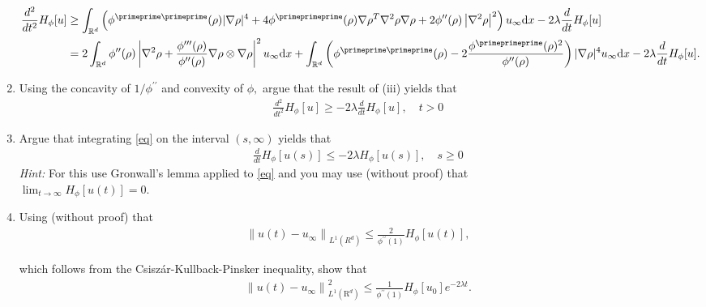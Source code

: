 \begin{exercise}
\begin{enumerate}[label = (\roman*)]
\begin{align*}
    \frac{d^{2}}{d t^{2}} H_{\phi}[u] &\geq
    \int_{\mathbb{R}^{d}}\left(\phi^{\primeprime \primeprime}(\rho)|\nabla \rho|^{4}+4
    \phi^{\primeprimeprime}(\rho) \nabla \rho^{T} \nabla^{2} \rho \nabla \rho+2
    \phi^{\prime \prime}(\rho)\left|\nabla^{2} \rho\right|^{2}\right) u_{\infty} \mathrm{d} x
    -2 \lambda \frac{d}{d t} H_{\phi}[u] \\
    &= 2 \int_{\mathbb{R}^{d}} \phi^{\prime \prime}(\rho)\left|\nabla^{2}
    \rho+\frac{\phi^{\prime \prime \prime}(\rho)}{\phi^{\prime \prime}(\rho)}
    \nabla \rho \otimes \nabla \rho\right|^{2} u_{\infty} \mathrm{d} x
    +\int_{\mathbb{R}^{d}}\left(\phi^{\primeprime \primeprime}(\rho)-2
    \frac{\phi^{\primeprimeprime}(\rho)^{2}}{\phi^{\prime \prime}(\rho)}\right)|\nabla \rho|^{4}
    u_{\infty} \mathrm{d} x
    -2 \lambda \frac{d}{d t} H_{\phi}[u].
  \end{align*}
  \item Using the concavity of $1 / \phi^{\prime \prime}$ and convexity of $\phi,$
  argue that the result of (iii) yields that
  \begin{align}\label{eq}
    \frac{d^{2}}{d t^{2}} H_{\phi}[u] \geq-2 \lambda \frac{d}{d t} H_{\phi}[u], \quad t>0
  \end{align}
  \item Argue that integrating \eqref{eq} on the interval $(s, \infty)$ yields that
  \begin{align*}
    \frac{d}{d t} H_{\phi}[u(s)] \leq-2 \lambda H_{\phi}[u(s)], \quad s \geq 0
  \end{align*}
  \textit{Hint:} For this use Gronwall's lemma applied to \eqref{eq} and you may use
  (without proof) that \\
   $\lim _{t \rightarrow \infty} H_{\phi}[u(t)]=0$.
  \item Using (without proof) that
  \begin{align*}
    \left\|u(t)-u_{\infty}\right\|_{L^{1}\left(R^{d}\right)}
    \leq \frac{2}{\phi^{\prime \prime}(1)} H_{\phi}[u(t)],
  \end{align*}

  which follows from the Csiszár-Kullback-Pinsker inequality, show that
  \begin{align*}
    \left\|u(t)-u_{\infty}\right\|_{L^{1}\left(\mathrm{R}^{d}\right)}^{2}
    \leq \frac{1}{\phi^{\prime \prime}(1)} H_{\phi}\left[u_{0}\right] e^{-2 \lambda t}.
  \end{align*}
\end{enumerate}
\end{exercise}

